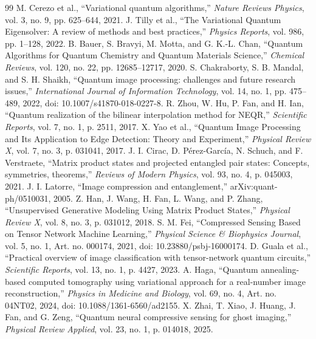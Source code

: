 \documentclass[sn-mathphys,Numbered]{sn-jnl}
\begin{document}
\begin{thebibliography}{99}
 M. Cerezo et al., ``Variational quantum algorithms,'' \textit{Nature Reviews Physics}, vol. 3, no. 9, pp. 625--644, 2021.
 J. Tilly et al., ``The Variational Quantum Eigensolver: A review of methods and best practices,'' \textit{Physics Reports}, vol. 986, pp. 1--128, 2022.
 B. Bauer, S. Bravyi, M. Motta, and G. K.-L. Chan, ``Quantum Algorithms for Quantum Chemistry and Quantum Materials Science,'' \textit{Chemical Reviews}, vol. 120, no. 22, pp. 12685--12717, 2020.
 S. Chakraborty, S. B. Mandal, and S. H. Shaikh, ``Quantum image processing: challenges and future research issues,'' \textit{International Journal of Information Technology}, vol. 14, no. 1, pp. 475--489, 2022, doi: 10.1007/s41870-018-0227-8.
 R. Zhou, W. Hu, P. Fan, and H. Ian, ``Quantum realization of the bilinear interpolation method for NEQR,'' \textit{Scientific Reports}, vol. 7, no. 1, p. 2511, 2017.
 X. Yao et al., ``Quantum Image Processing and Its Application to Edge Detection: Theory and Experiment,'' \textit{Physical Review X}, vol. 7, no. 3, p. 031041, 2017.
 J. I. Cirac, D. Pérez-García, N. Schuch, and F. Verstraete, ``Matrix product states and projected entangled pair states: Concepts, symmetries, theorems,'' \textit{Reviews of Modern Physics}, vol. 93, no. 4, p. 045003, 2021.
 J. I. Latorre, ``Image compression and entanglement,'' arXiv:quant-ph/0510031, 2005.
 Z. Han, J. Wang, H. Fan, L. Wang, and P. Zhang, ``Unsupervised Generative Modeling Using Matrix Product States,'' \textit{Physical Review X}, vol. 8, no. 3, p. 031012, 2018.
 S. M. Fei, ``Compressed Sensing Based on Tensor Network Machine Learning,'' \textit{Physical Science \& Biophysics Journal}, vol. 5, no. 1, Art. no. 000174, 2021, doi: 10.23880/psbj-16000174.
 D. Guala et al., ``Practical overview of image classification with tensor-network quantum circuits,'' \textit{Scientific Reports}, vol. 13, no. 1, p. 4427, 2023.
 A. Haga, ``Quantum annealing-based computed tomography using variational approach for a real-number image reconstruction,'' \textit{Physics in Medicine and Biology}, vol. 69, no. 4, Art. no. 04NT02, 2024, doi: 10.1088/1361-6560/ad2155.
 X. Zhai, T. Xiao, J. Huang, J. Fan, and G. Zeng, ``Quantum neural compressive sensing for ghost imaging,'' \textit{Physical Review Applied}, vol. 23, no. 1, p. 014018, 2025.

\end{thebibliography}
\end{document}
